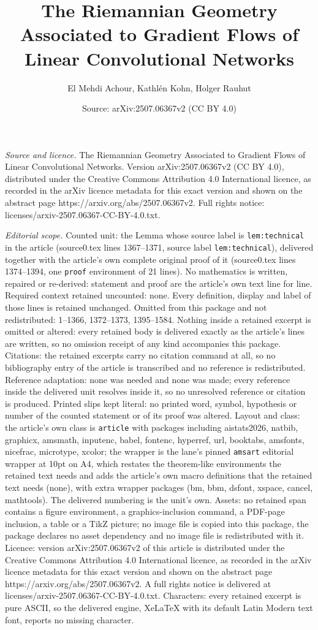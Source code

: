 \documentclass[10pt,a4paper]{amsart}
\title[The Riemannian Geometry Associated to Gradient Flows of Line]{The Riemannian Geometry Associated to Gradient Flows of Linear Convolutional Networks}
\author{El Mehdi Achour, Kathl\'en Kohn, Holger Rauhut}
\date{Source: arXiv:2507.06367v2 (CC BY 4.0)}
\begin{document}
\maketitle

\noindent\emph{Source and licence.} The Riemannian Geometry Associated to Gradient Flows of Linear Convolutional Networks. Version arXiv:2507.06367v2 (CC BY 4.0), distributed under the Creative Commons Attribution 4.0 International licence, as recorded in the arXiv licence metadata for this exact version and shown on the abstract page https://arxiv.org/abs/2507.06367v2. Full rights notice: licenses/arxiv-2507.06367-CC-BY-4.0.txt.\par\smallskip

\noindent\textit{Editorial scope.} Counted unit: the Lemma whose source label is \texttt{lem:technical} in the article (source0.tex lines 1367--1371, source label \texttt{lem:technical}), delivered together with the article's own complete original proof of it (source0.tex lines 1374--1394, one \texttt{proof} environment of 21 lines). No mathematics is written, repaired or re-derived: statement and proof are the article's own text line for line. Required context retained uncounted: none. Every definition, display and label of those lines is retained unchanged. Omitted from this package and not redistributed: 1--1366, 1372--1373, 1395--1584. Nothing inside a retained excerpt is omitted or altered: every retained body is delivered exactly as the article's lines are written, so no omission receipt of any kind accompanies this package. Citations: the retained excerpts carry no citation command at all, so no bibliography entry of the article is transcribed and no reference is redistributed. Reference adaptation: none was needed and none was made; every reference inside the delivered unit resolves inside it, so no unresolved reference or citation is produced. Printed slips kept literal: no printed word, symbol, hypothesis or number of the counted statement or of its proof was altered. Layout and class: the article's own class is \texttt{article} with packages including aistats2026, natbib, graphicx, amsmath, inputenc, babel, fontenc, hyperref, url, booktabs, amsfonts, nicefrac, microtype, xcolor; the wrapper is the lane's pinned \texttt{amsart} editorial wrapper at 10pt on A4, which restates the theorem-like environments the retained text needs and adds the article's own macro definitions that the retained text needs (none), with extra wrapper packages (bm, bbm, dsfont, xspace, cancel, mathtools). The delivered numbering is the unit's own. Assets: no retained span contains a figure environment, a graphics-inclusion command, a PDF-page inclusion, a table or a TikZ picture; no image file is copied into this package, the package declares no asset dependency and no image file is redistributed with it. Licence: version arXiv:2507.06367v2 of this article is distributed under the Creative Commons Attribution 4.0 International licence, as recorded in the arXiv licence metadata for this exact version and shown on the abstract page https://arxiv.org/abs/2507.06367v2. A full rights notice is delivered at licenses/arxiv-2507.06367-CC-BY-4.0.txt. Characters: every retained excerpt is pure ASCII, so the delivered engine, XeLaTeX with its default Latin Modern text font, reports no missing character.
\end{document}
